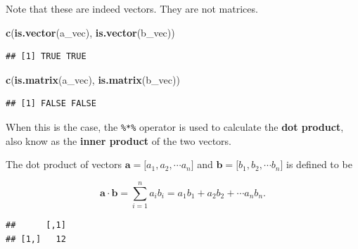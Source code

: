\documentclass[]{book}
\newenvironment{Shaded}{\begin{snugshade}}{\end{snugshade}}
\newcommand{\KeywordTok}[1]{\textcolor[rgb]{0.13,0.29,0.53}{\textbf{#1}}}
\newcommand{\StringTok}[1]{\textcolor[rgb]{0.31,0.60,0.02}{#1}}
\newcommand{\CommentTok}[1]{\textcolor[rgb]{0.56,0.35,0.01}{\textit{#1}}}
\newcommand{\OperatorTok}[1]{\textcolor[rgb]{0.81,0.36,0.00}{\textbf{#1}}}
\newcommand{\NormalTok}[1]{#1}
\theoremstyle{definition}
\theoremstyle{definition}
\theoremstyle{definition}
\theoremstyle{remark}
\begin{document}
Note that these are indeed vectors. They are not matrices.

\begin{Shaded}
\begin{Highlighting}[]
\KeywordTok{c}\NormalTok{(}\KeywordTok{is.vector}\NormalTok{(a_vec), }\KeywordTok{is.vector}\NormalTok{(b_vec))}
\end{Highlighting}
\end{Shaded}

\begin{verbatim}
## [1] TRUE TRUE
\end{verbatim}

\begin{Shaded}
\begin{Highlighting}[]
\KeywordTok{c}\NormalTok{(}\KeywordTok{is.matrix}\NormalTok{(a_vec), }\KeywordTok{is.matrix}\NormalTok{(b_vec))}
\end{Highlighting}
\end{Shaded}

\begin{verbatim}
## [1] FALSE FALSE
\end{verbatim}

When this is the case, the \texttt{\%*\%} operator is used to calculate
the \textbf{dot product}, also know as the \textbf{inner product} of the
two vectors.

The dot product of vectors
\(\boldsymbol{a} = \lbrack a_1, a_2, \cdots a_n \rbrack\) and
\(\boldsymbol{b} = \lbrack b_1, b_2, \cdots b_n \rbrack\) is defined to
be

\[
\boldsymbol{a} \cdot \boldsymbol{b} = \sum_{i = 1}^{n} a_i b_i = a_1 b_1 + a_2 b_2 + \cdots a_n b_n.
\]

\begin{Shaded}
\end{Shaded}

\begin{verbatim}
##      [,1]
## [1,]   12
\end{verbatim}

\begin{Shaded}
\end{Shaded}
\end{document}
